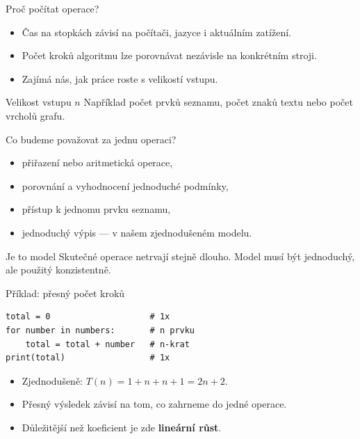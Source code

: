 \documentclass[aspectratio=169]{beamer}
\begin{document}
\begin{frame}{Proč počítat operace?}
  \begin{itemize}
    \item Čas na stopkách závisí na počítači, jazyce i aktuálním zatížení.
    \item Počet kroků algoritmu lze porovnávat nezávisle na konkrétním stroji.
    \item Zajímá nás, jak práce roste s velikostí vstupu.
  \end{itemize}
  \begin{block}{Velikost vstupu \(n\)}
    Například počet prvků seznamu, počet znaků textu nebo počet vrcholů grafu.
  \end{block}
\end{frame}

\begin{frame}{Co budeme považovat za jednu operaci?}
  \begin{itemize}
    \item přiřazení nebo aritmetická operace,
    \item porovnání a vyhodnocení jednoduché podmínky,
    \item přístup k jednomu prvku seznamu,
    \item jednoduchý výpis --- v našem zjednodušeném modelu.
  \end{itemize}
  \begin{alertblock}{Je to model}
    Skutečné operace netrvají stejně dlouho. Model musí být jednoduchý, ale použitý konzistentně.
  \end{alertblock}
\end{frame}

\begin{frame}[fragile]{Příklad: přesný počet kroků}
\begin{lstlisting}[style=python]
total = 0                    # 1x
for number in numbers:       # n prvku
    total = total + number   # n-krat
print(total)                 # 1x
\end{lstlisting}
  \begin{itemize}
    \item Zjednodušeně: \(T(n)=1+n+n+1=2n+2\).
    \item Přesný výsledek závisí na tom, co zahrneme do jedné operace.
    \item Důležitější než koeficient je zde \textbf{lineární růst}.
  \end{itemize}
\end{frame}
\end{document}
